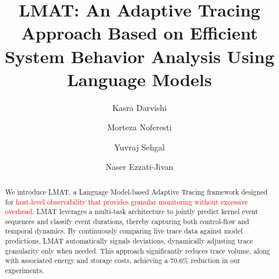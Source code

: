 \documentclass[preprint,12pt]{elsarticle}
\begin{document}
\begin{frontmatter}



\title{LMAT: An Adaptive Tracing Approach Based on Efficient System Behavior Analysis Using Language Models}

\author[1]{Kasra Darvishi}

\author[1]{Morteza Noferesti}

\author[1]{Yuvraj Sehgal}

\author[1]{Naser Ezzati-Jivan}





\begin{abstract}
We introduce LMAT, a Language Model-based Adaptive Tracing framework designed for \textcolor{red}{host-level observability that provides granular monitoring without excessive overhead}. LMAT leverages a multi-task architecture to jointly predict kernel event sequences and classify event durations, thereby capturing both control-flow and temporal dynamics. By continuously comparing live trace data against model predictions, LMAT automatically signals deviations, dynamically adjusting trace granularity only when needed. This approach significantly reduces trace volume, along with associated energy and storage costs, achieving a 70.6\% reduction in our experiments.


\end{abstract}
\end{frontmatter}
\end{document}
